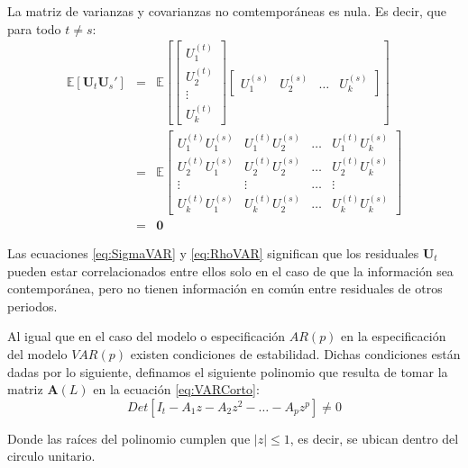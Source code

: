 \documentclass[
]{book}
\begin{document}
\begin{enumerate}
  La matriz de varianzas y covarianzas no comtemporáneas es nula. Es decir, que para todo \(t \neq s\):
  \begin{eqnarray}
      \mathbb{E} [\mathbf{U}_t \mathbf{U}_s'] 
      & = &
      \mathbb{E} \left[
      \begin{bmatrix}
      U^{(t)}_{1} \\ U^{(t)}_{2} \\ \vdots \\ U^{(t)}_{k}
      \end{bmatrix}
      \begin{bmatrix}
      U^{(s)}_{1} & U^{(s)}_{2} & \ldots & U^{(s)}_{k}
      \end{bmatrix}
      \right] \nonumber \\
      & =  & \mathbb{E}
      \begin{bmatrix}
      U^{(t)}_{1} U^{(s)}_{1} & U^{(t)}_{1} U^{(s)}_{2} & \ldots & U^{(t)}_{1} U^{(s)}_{k} \\
      U^{(t)}_{2} U^{(s)}_{1} & U^{(t)}_{2} U^{(s)}_{2} & \ldots & U^{(t)}_{2} U^{(s)}_{k} \\
      \vdots & \vdots & \ldots & \vdots \\
      U^{(t)}_{k} U^{(s)}_{1} & U^{(t)}_{k} U^{(s)}_{2} & \ldots & U^{(t)}_{k} U^{(s)}_{k}
      \end{bmatrix} \nonumber \\
      & = & \mathbf{0}
      \label{eq:RhoVAR}
  \end{eqnarray}
\end{enumerate}

Las ecuaciones \eqref{eq:SigmaVAR} y \eqref{eq:RhoVAR} significan que los residuales \(\mathbf{U}_t\) pueden estar correlacionados entre ellos solo en el caso de que la información sea contemporánea, pero no tienen información en común entre residuales de otros periodos.

Al igual que en el caso del modelo o especificación \(AR(p)\) en la especificación del modelo \(VAR(p)\) existen condiciones de estabilidad. Dichas condiciones están dadas por lo siguiente, definamos el siguiente polinomio que resulta de tomar la matriz \(\mathbf{A}(L)\) en la ecuación \eqref{eq:VARCorto}:
\begin{equation}
    Det[I_t - A_1 z - A_2 z^2 - \ldots - A_p z^p] \neq 0
\end{equation}

Donde las raíces del polinomio cumplen que \(|z| \leq 1\), es decir, se ubican dentro del circulo unitario.
\end{document}
